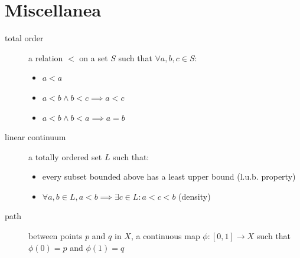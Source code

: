 \documentclass[tbtags,columns=2]{cheatsheet}
\begin{document}
\section{Miscellanea}
\begin{description}
    \item[total order] a relation $<$ on a set $S$ such that $\forall a,b,c \in S$: \begin{itemize}
        \item $a < a$
        \item $a < b \land b < c \implies a < c$
        \item $a < b \land b < a \implies a = b$
    \end{itemize}
    \item[linear continuum] a totally ordered set $L$ such that: \begin{itemize}
        \item every subset bounded above has a least upper bound (l.u.b. property)
        \item $\forall a,b \in L, a < b \implies \exists c \in L : a < c < b$ (density)
    \end{itemize}
    \item[path] between points $p$ and $q$ in $X$, a continuous map $\phi:[0,1]\to X$ such that $\phi(0) = p$ and $\phi(1)=q$
\end{description}
\end{document}
